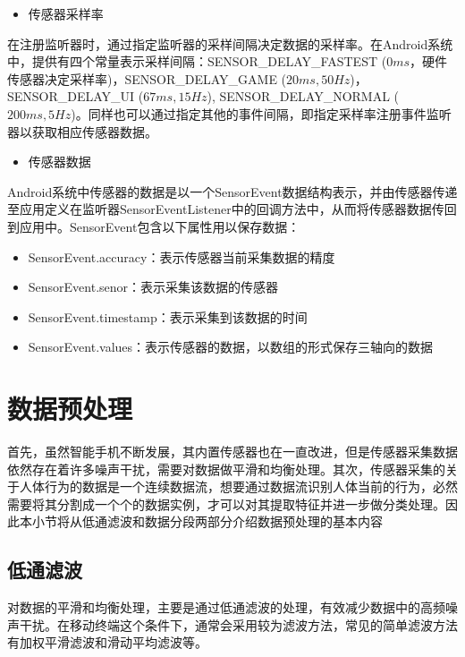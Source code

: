 \begin{itemize}
	\item 传感器采样率
\end{itemize}
\par 在注册监听器时，通过指定监听器的采样间隔决定数据的采样率。在Android系统中，提供有四个常量表示采样间隔：SENSOR\_DELAY\_FASTEST ($0ms$，硬件传感器决定采样率)，SENSOR\_DELAY\_GAME ($20ms, 50Hz$)，SENSOR\_DELAY\_UI ($67ms, 15Hz$), SENSOR\_DELAY\_NORMAL ($200ms, 5Hz$)。同样也可以通过指定其他的事件间隔，即指定采样率注册事件监听器以获取相应传感器数据。

\begin{itemize}
	\item 传感器数据
\end{itemize}
\par Android系统中传感器的数据是以一个SensorEvent数据结构表示，并由传感器传递至应用定义在监听器SensorEventListener中的回调方法中，从而将传感器数据传回到应用中。SensorEvent包含以下属性用以保存数据：
\begin{itemize}
	\item SensorEvent.accuracy：表示传感器当前采集数据的精度
	\item SensorEvent.senor：表示采集该数据的传感器
	\item SensorEvent.timestamp：表示采集到该数据的时间
	\item SensorEvent.values：表示传感器的数据，以数组的形式保存三轴向的数据
\end{itemize}

\section{数据预处理}
\par 首先，虽然智能手机不断发展，其内置传感器也在一直改进，但是传感器采集数据依然存在着许多噪声干扰，需要对数据做平滑和均衡处理。其次，传感器采集的关于人体行为的数据是一个连续数据流，想要通过数据流识别人体当前的行为，必然需要将其分割成一个个的数据实例，才可以对其提取特征并进一步做分类处理。因此本小节将从低通滤波和数据分段两部分介绍数据预处理的基本内容

\subsection{低通滤波}
\par 对数据的平滑和均衡处理，主要是通过低通滤波的处理，有效减少数据中的高频噪声干扰。在移动终端这个条件下，通常会采用较为滤波方法，常见的简单滤波方法有加权平滑滤波和滑动平均滤波等。

